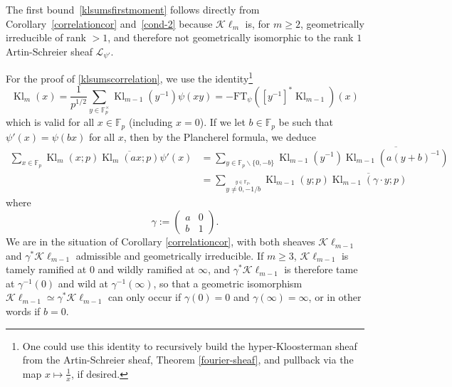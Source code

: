 \documentclass[12pt,a4paper,reqno]{amsart}
\numberwithin{equation}{section}
\newcommand{\FT}{\mathrm{FT}}
\DeclareMathOperator{\hypk}{Kl}
\newcommand{\Kl}{\mathcal{K}\ell}
\theoremstyle{plain}
\theoremstyle{definition}
\newcommand\F{\mathbb{F}}
\newcommand\ov{\overline}
\newcommand\wcheck{\widecheck}
\newcommand\mcL{\mathcal{L}}
\newcommand\Fp{\F_{p}}
\newcommand\Fpt{\F_{p}^{\times}}
\def\stacksum#1#2{{\stackrel{{\scriptstyle #1}}
{{\scriptstyle #2}}}}
\begin{document}
\proof The first bound~\eqref{klsumsfirstmoment} follows directly from
Corollary~\ref{correlationcor} and~\eqref{cond-2} because $\Kl_m$ is,
for $m\geq 2$, geometrically irreducible of rank $>1$, and therefore
not geometrically isomorphic to the rank $1$ Artin-Schreier sheaf
$\mcL_{\psi'}$.

For the proof of \eqref{klsumscorrelation}, we use the identity\footnote{One could use this identity to recursively build the hyper-Kloosterman sheaf from the Artin-Schreier sheaf, Theorem \ref{fourier-sheaf}, and pullback via the map $x \mapsto \frac{1}{x}$, if desired.} 
$$
\hypk_m(x)=\frac{1}{p^{1/2}}\sum_{y\in\Fpt}\hypk_{m-1}(y^{-1})\psi(xy)=
-\FT_\psi([y^{-1}]^*\hypk_{m-1})(x)
$$
which is valid for all $x\in\Fp$ (including $x=0$). If we let
$b\in\Fp$ be such that $\psi'(x)=\psi(bx)$ for all $x$, then by the
Plancherel formula, we deduce
\begin{align*}
  \sum_{x\in\Fp}\hypk_m(x;p)\ov{\hypk_m(ax;p)}\psi'(x)&=
  \sum_{y\in\Fp \backslash \{0,-b\}}\hypk_{m-1}(y^{-1})\ov{\hypk_{m-1}(a(y+b)^{-1})}\\
  &=\sum_\stacksum{y\in\Fp,}{ y\neq
    0,-1/b}\hypk_{m-1}(y;p)\ov{\hypk_{m-1}(\gamma\cdot y;p)}
\end{align*}
where
$$
\gamma:=\begin{pmatrix}
a&0\\b&1
\end{pmatrix}.
$$  
We are in the situation of Corollary \ref{correlationcor}, with both
sheaves $\Kl_{m-1}$ and $\gamma^*\Kl_{m-1}$ admissible and
geometrically irreducible.  If $m\geq 3$, $\Kl_{m-1}$ is tamely
ramified at $0$ and wildly ramified at $\infty$, and
$\gamma^*\Kl_{m-1}$ is therefore tame at $\gamma^{-1}(0)$ and wild at
$\gamma^{-1}(\infty)$, so that a geometric isomorphism
$\Kl_{m-1}\simeq \gamma^*\Kl_{m-1}$ can only occur if $\gamma(0)=0$
and $\gamma(\infty)=\infty$, or in other words if $b=0$. 
\end{document}
